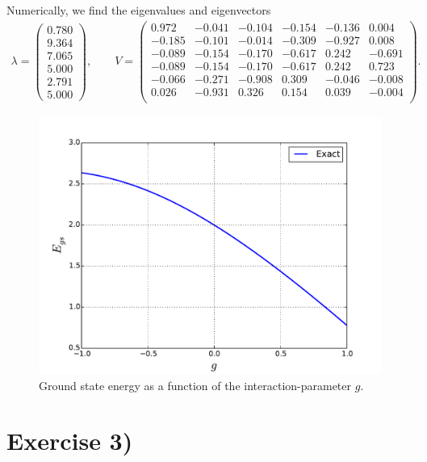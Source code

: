\documentclass[a4paper, 11pt, notitlepage, english]{article}
\begin{document}
Numerically, we find the eigenvalues and eigenvectors
\begin{align*}
\lambda = 
\begin{pmatrix}
0.780 \\  9.364 \\  7.065 \\  5.000 \\  2.791 \\  5.000 
\end{pmatrix}, \qquad
V =
\begin{pmatrix}
0.972 &  -0.041 &  -0.104 &  -0.154 &  -0.136 &  0.004  \\
-0.185 &  -0.101 &  -0.014 &  -0.309 &  -0.927 &  0.008  \\
-0.089 &  -0.154 &  -0.170 &  -0.617 &  0.242 &  -0.691  \\
-0.089 &  -0.154 &  -0.170 &  -0.617 &  0.242 &  0.723  \\
-0.066 &  -0.271 &  -0.908 &  0.309 &  -0.046 &  -0.008  \\
0.026 &  -0.931 &  0.326 &  0.154 &  0.039 &  -0.004  \\
\end{pmatrix}.
\end{align*}

\begin{figure}[htpb]
	\includegraphics[width=\textwidth]{proj2_2.pdf}
	\caption{Ground state energy as a function of the interaction-parameter $g$. \label{fig:plot1}}
\end{figure}

\clearpage

\section*{Exercise 3)}
\end{document}
